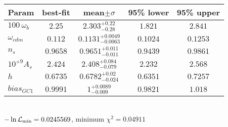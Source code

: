 \begin{tabular}{|l|c|c|c|c|} 
 \hline 
Param & best-fit & mean$\pm\sigma$ & 95\% lower & 95\% upper \\ \hline 
$100~\omega_{b }$ &$2.25$ & $2.303_{-0.28}^{+0.22}$ & $1.821$ & $2.841$ \\ 
$\omega_{cdm }$ &$0.112$ & $0.1131_{-0.0063}^{+0.0049}$ & $0.1024$ & $0.1253$ \\ 
$n_{s }$ &$0.9658$ & $0.9651_{-0.011}^{+0.011}$ & $0.9439$ & $0.9861$ \\ 
$10^{+9}A_{s }$ &$2.424$ & $2.408_{-0.079}^{+0.084}$ & $2.232$ & $2.568$ \\ 
$h$ &$0.6735$ & $0.6782_{-0.024}^{+0.02}$ & $0.6351$ & $0.7257$ \\ 
$bias_{GC 1 }$ &$0.9991$ & $1_{-0.009}^{+0.0089}$ & $0.9821$ & $1.018$ \\ 
\hline 
 \end{tabular} \\ 
$-\ln{\cal L}_\mathrm{min} =0.0245569$, minimum $\chi^2=0.04911$ \\ 
